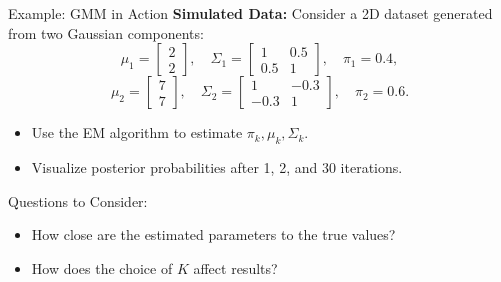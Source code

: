 \documentclass[11pt,handout,aspectratio=169]{beamer}
\begin{document}
\begin{frame}{Example: GMM in Action}
\textbf{Simulated Data:} Consider a 2D dataset generated from two Gaussian components:
\[
\mu_1 = \begin{bmatrix} 2 \\ 2 \end{bmatrix}, \quad
\Sigma_1 = \begin{bmatrix} 1 & 0.5 \\ 0.5 & 1 \end{bmatrix}, \quad
\pi_1 = 0.4,
\]
\[
\mu_2 = \begin{bmatrix} 7 \\ 7 \end{bmatrix}, \quad
\Sigma_2 = \begin{bmatrix} 1 & -0.3 \\ -0.3 & 1 \end{bmatrix}, \quad
\pi_2 = 0.6.
\]

\begin{itemize}
    \item Use the EM algorithm to estimate \( \pi_k, \mu_k, \Sigma_k \).
    \item Visualize posterior probabilities after 1, 2, and 30 iterations.
\end{itemize}

\begin{alertblock}{Questions to Consider:}
    \begin{itemize}
        \item How close are the estimated parameters to the true values?
        \item How does the choice of \( K \) affect results?
    \end{itemize}
\end{alertblock}
\end{frame}
\end{document}
